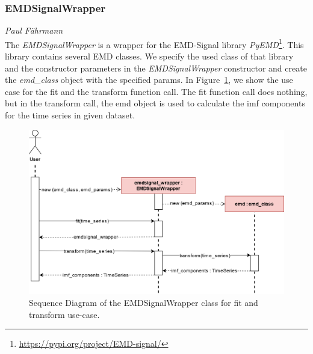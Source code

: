 \subsubsection*{EMDSignalWrapper}
\vspace*{-10mm}\hfill{\normalsize\emph{Paul Fährmann}}
\\
The \textit{EMDSignalWrapper} is a wrapper for the EMD-Signal library \textit{PyEMD}\footnote{\href{https://pypi.org/project/EMD-signal/}{https://pypi.org/project/EMD-signal/}}. This library contains several EMD classes. We specify the used class of that library and the constructor parameters in the \textit{EMDSignalWrapper} constructor and create the \textit{emd\_class} object with the specified params. In Figure~\ref{fig:tfe-emd-signal-seq}, we show the use case for the fit and the transform function call. The fit function call does nothing, but in the transform call, the emd object is used to calculate the imf components for the time series in given dataset.
\begin{figure}[ht]
    \centering
    \includegraphics[width=\textwidth]{gfx/emdsignal_sequence}
    \caption{Sequence Diagram of the EMDSignalWrapper class for fit and transform use-case.}
    \label{fig:tfe-emd-signal-seq}
\end{figure}
